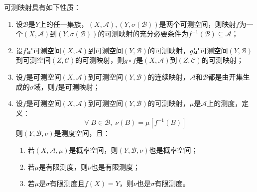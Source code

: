 \begin{property}\label{prop:MeasurableMapping}
	可测映射具有如下性质：
	\begin{enumerate}
		\item 设$\mathscr{B}$是$Y$上的任一集族，$(X,\mathscr{A}),(Y,\sigma(\mathscr{B}))$是两个可测空间，则映射$f$为一个$(X,\mathscr{A})$到$(Y,\sigma(\mathscr{B}))$的可测映射的充分必要条件为$f^{-1}(\mathscr{B})\subseteq\mathscr{A}$；
		\item 设$f$是可测空间$(X,\mathscr{A})$到可测空间$(Y,\mathscr{B})$的可测映射，$g$是可测空间$(Y,\mathscr{B})$到可测空间$(Z,\mathscr{C})$的可测映射，则$g\circ f$是$(X,\mathscr{A})$到$(Z,\mathscr{C})$的可测映射；
		\item 设$f$是可测空间$(X,\mathscr{A})$到可测空间$(Y,\mathscr{B})$的连续映射，$\mathscr{A}$和$\mathscr{B}$都是由开集生成的$\sigma$域，则$f$是可测映射；
		\item 设$f$是可测空间$(X,\mathscr{A})$到可测空间$(Y,\mathscr{B})$的可测映射，$\mu$是$\mathscr{A}$上的测度，定义：
		\begin{equation*}
			\forall\;B\in\mathscr{B},\;\nu(B)=\mu[f^{-1}(B)]
		\end{equation*}
		则$(Y,\mathscr{B},\nu)$是测度空间，且：
		\begin{enumerate}
			\item 若$(X,\mathscr{A},\mu)$是概率空间，则$(Y,\mathscr{B},\nu)$也是概率空间；
			\item 若$\mu$是有限测度，则$\nu$也是有限测度；
			\item 若$\mu$是$\sigma$有限测度且$f(X)=Y$，则$\nu$也是$\sigma$有限测度。
		\end{enumerate}
	\end{enumerate}
\end{property}

